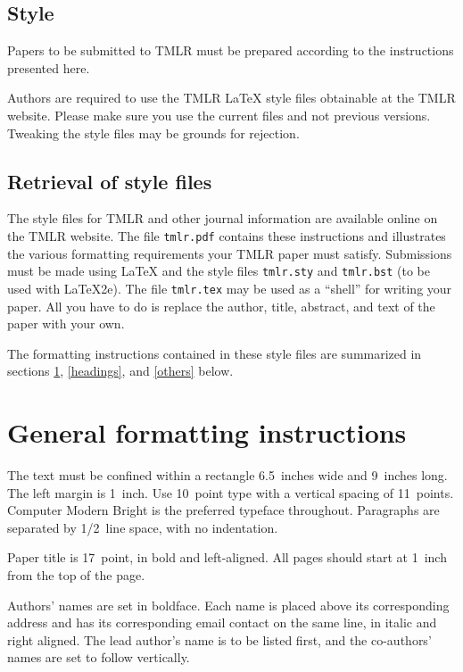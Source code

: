 \documentclass[10pt]{article} %
\begin{document}
\subsection{Style}

Papers to be submitted to TMLR must be prepared according to the
instructions presented here.

Authors are required to use the TMLR \LaTeX{} style files obtainable at the
TMLR website. Please make sure you use the current files and
not previous versions. Tweaking the style files may be grounds for rejection.

\subsection{Retrieval of style files}

The style files for TMLR and other journal information are available online on
the TMLR website.
The file \verb+tmlr.pdf+ contains these
instructions and illustrates the
various formatting requirements your TMLR paper must satisfy.
Submissions must be made using \LaTeX{} and the style files
\verb+tmlr.sty+ and \verb+tmlr.bst+ (to be used with \LaTeX{}2e). The file
\verb+tmlr.tex+ may be used as a ``shell'' for writing your paper. All you
have to do is replace the author, title, abstract, and text of the paper with
your own.

The formatting instructions contained in these style files are summarized in
sections \ref{gen_inst}, \ref{headings}, and \ref{others} below.

\section{General formatting instructions}
\label{gen_inst}

The text must be confined within a rectangle 6.5~inches wide and
9~inches long. The left margin is 1~inch.
Use 10~point type with a vertical spacing of 11~points. Computer Modern Bright is the
preferred typeface throughout. Paragraphs are separated by 1/2~line space,
with no indentation.

Paper title is 17~point, in bold and left-aligned.
All pages should start at 1~inch from the top of the page.

Authors' names are
set in boldface. Each name is placed above its corresponding
address and has its corresponding email contact on the same line, in italic 
and right aligned. The lead author's name is to be listed first, and
the co-authors' names are set to follow vertically.
\end{document}
